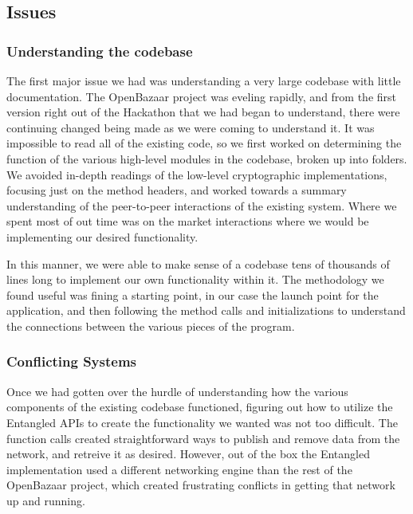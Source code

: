 \documentclass[12pt,twocolumn]{article}
\begin{document}
\newcommand{\Twisted}{}
\def\Twisted/{{\sc Twisted}}
\newcommand{\Tornado}{}
\def\Tornado/{{\sc Tornado}}
\newcommand{\Entangled}{}
\def\Entangled/{{\sc Entangled}}

\subsection{Issues}

\subsubsection{Understanding the codebase}
The first major issue we had was understanding a very large codebase with little documentation. The OpenBazaar project was eveling rapidly, and from the first version right out of the Hackathon that we had began to understand, there were continuing changed being made as we were coming to understand it. It was impossible to read all of the existing code, so we first worked on determining the function of the various high-level modules in the codebase, broken up into folders. We avoided in-depth readings of the low-level cryptographic implementations, focusing just on the method headers, and worked towards a summary understanding of the peer-to-peer interactions of the existing system. Where we spent most of out time was on the market interactions where we would be implementing our desired functionality.

In this manner, we were able to make sense of a codebase tens of thousands of lines long to implement our own functionality within it. The methodology we found useful was fining a starting point, in our case the launch point for the application, and then following the method calls and initializations to understand the connections between the various pieces of the program.

\subsubsection{Conflicting Systems}
Once we had gotten over the hurdle of understanding how the various components of the existing codebase functioned, figuring out how to utilize the \Entangled/ APIs to create the functionality we wanted was not too difficult. The function calls created straightforward ways to publish and remove data from the network, and retreive it as desired. However, out of the box the \Entangled/ implementation used a different networking engine than the rest of the OpenBazaar project, which created frustrating conflicts in getting that network up and running.
\end{document}
